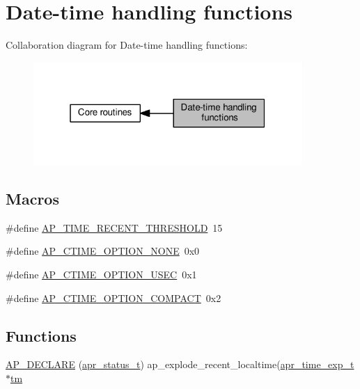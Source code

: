 \hypertarget{group__APACHE__CORE__TIME}{}\section{Date-\/time handling functions}
\label{group__APACHE__CORE__TIME}
Collaboration diagram for Date-\/time handling functions\+:
\nopagebreak
\begin{figure}[H]
\begin{center}
\leavevmode
\includegraphics[width=289pt]{group__APACHE__CORE__TIME}
\end{center}
\end{figure}
\subsection*{Macros}
\begin{DoxyCompactItemize}
\item 
\#define \hyperlink{group__APACHE__CORE__TIME_ga95563fe935770550de983768cbfc3832}{A\+P\+\_\+\+T\+I\+M\+E\+\_\+\+R\+E\+C\+E\+N\+T\+\_\+\+T\+H\+R\+E\+S\+H\+O\+LD}~15
\item 
\#define \hyperlink{group__APACHE__CORE__TIME_ga98f2aa6d2065300ca2aa77092cc24953}{A\+P\+\_\+\+C\+T\+I\+M\+E\+\_\+\+O\+P\+T\+I\+O\+N\+\_\+\+N\+O\+NE}~0x0
\item 
\#define \hyperlink{group__APACHE__CORE__TIME_ga7c26045ad48e445322f4dfe542f53e95}{A\+P\+\_\+\+C\+T\+I\+M\+E\+\_\+\+O\+P\+T\+I\+O\+N\+\_\+\+U\+S\+EC}~0x1
\item 
\#define \hyperlink{group__APACHE__CORE__TIME_gadaa484ceea6b719546b9db9ea6cf5810}{A\+P\+\_\+\+C\+T\+I\+M\+E\+\_\+\+O\+P\+T\+I\+O\+N\+\_\+\+C\+O\+M\+P\+A\+CT}~0x2
\end{DoxyCompactItemize}
\subsection*{Functions}
\begin{DoxyCompactItemize}
\item 
\hyperlink{group__APACHE__CORE__TIME_ga969f65e7aa30314413c766679ae7ca80}{A\+P\+\_\+\+D\+E\+C\+L\+A\+RE} (\hyperlink{group__apr__errno_gaa5105fa83cc322f09382292db8b47593}{apr\+\_\+status\+\_\+t}) ap\+\_\+explode\+\_\+recent\+\_\+localtime(\hyperlink{structapr__time__exp__t}{apr\+\_\+time\+\_\+exp\+\_\+t} $\ast$\hyperlink{pcretest_8txt_aa2e3274466b5ab2887d8d52dd8a50e8d}{tm}
\end{DoxyCompactItemize}
